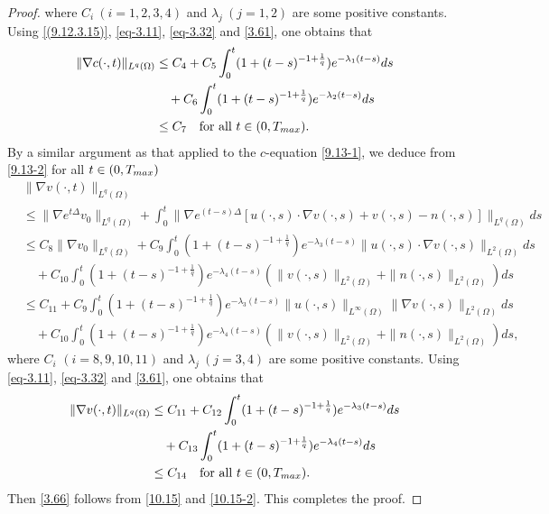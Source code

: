 \documentclass[10pt,a4paper]{amsart}
\numberwithin{equation}{section}
\begin{document}
\begin{proof}
where $ C_i \ (i = 1, 2, 3, 4) $ and $ \lambda_j \ (j = 1, 2) $ are some positive 
constants. Using \eqref{(9.12.3.15)}, \eqref{eq-3.11},
\eqref{eq-3.32} and \eqref{3.61}, one obtains that
\begin{equation}\label{10.15}
\begin{aligned}
\|\nabla c(\cdot, t)\|_{L^q(\Omega)} 
&\leq C_4 + C_5\int_{0}^t (1 + (t - s)^{-1 + \frac{1}{q}}) e^{-\lambda_1(t - s)} ds\\
&\quad + C_6 \int_{0}^t (1 + (t - s)^{-1 + \frac{1}{q} }) e^{-\lambda_2(t - s)} ds\\
&\leq C_7 \quad \text{for all } t \in (0, T_{\rm max}).
\end{aligned}
\end{equation}
By a similar argument as that applied to the $ c $-equation \eqref{9.13-1}, we deduce 
from \eqref{9.13-2} for all $t \in (0, T_{\rm max})$
\begin{align*}
&\|\nabla v(\cdot, t)\|_{L^q(\Omega)} \\&\leq \| \nabla e^{t\Delta} v_0\|_{L^q(\Omega)} 
 + \int_{0}^t \| \nabla e^{(t - s)\Delta} [ u(\cdot, s) \cdot
\nabla v(\cdot, s) + v(\cdot, s) - n(\cdot, s) ] \|_{L^q(\Omega)} ds \\
&\leq C_8\|\nabla v_0 \|_{L^q(\Omega)} + C_{9} \int_{0}^t
  (1 + (t - s)^{-1 + \frac{1}{q}}) e^{-\lambda_3(t - s)} \| u(\cdot, s) \cdot 
  \nabla v(\cdot,s) \|_{L^2(\Omega)} ds \\
&\quad + C_{10}  \int_{0}^t (1 + (t - s)^{-1 + \frac{1}{q}}) 
 e^{-\lambda_4(t - s)} ( \| v(\cdot, s) \|_{L^2(\Omega)} 
 + \| n(\cdot, s) \|_{L^2(\Omega)}) ds \\
&\leq C_{11} + C_{9} \int_{0}^t (1 + (t - s)^{-1 + \frac{1}{q}}) e^{-\lambda_3(t - s)} 
 \| u(\cdot, s) \|_{L^\infty(\Omega)}\| \nabla v(\cdot, s) \|_{L^2(\Omega)} ds\\
&\quad + C_{10} \int_{0}^t (1 + (t - s)^{-1 + \frac{1}{q}}) e^{-\lambda_4(t - s)}
 ( \| v(\cdot, s) \|_{L^2(\Omega)} + \| n(\cdot, s) \|_{L^2(\Omega)})ds ,
\end{align*}
where $ C_i$ $(i =8, 9, 10, 11) $ and $ \lambda_j \ (j = 3, 4) $ are some positive 
constants. Using \eqref{eq-3.11},
\eqref{eq-3.32} and \eqref{3.61}, one obtains that
\begin{equation}\label{10.15-2}
\begin{aligned}
\|\nabla v(\cdot, t)\|_{L^q(\Omega)}
& \leq C_{11} + C_{12}\int_0^t (1 + (t - s)^{-1 + \frac{1}{q}}) e^{-\lambda_3(t - s)} ds\\
&\quad + C_{13}\int_0^t (1 + (t - s)^{-1 + \frac{1}{q} }) e^{-\lambda_4(t - s)} ds \\
&\leq C_{14} \quad \text{for all } t \in (0, T_{\rm max}).
\end{aligned}
\end{equation}
Then \eqref{3.66}  follows from \eqref{10.15} and \eqref{10.15-2}. 
This completes the proof.
\end{proof}
\end{document}
